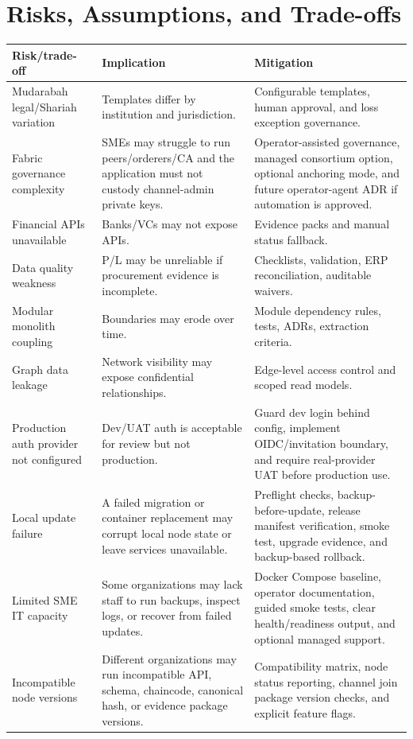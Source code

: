 \documentclass[11pt,a4paper]{article}
\begin{document}
\section{Risks, Assumptions, and Trade-offs}
\begin{longtable}{L{36mm}L{70mm}L{36mm}}
\toprule
\textbf{Risk/trade-off} & \textbf{Implication} & \textbf{Mitigation} \\
\midrule
Mudarabah legal/Shariah variation & Templates differ by institution and jurisdiction. & Configurable templates, human approval, and loss exception governance. \\
Fabric governance complexity & SMEs may struggle to run peers/orderers/CA and the application must not custody channel-admin private keys. & Operator-assisted governance, managed consortium option, optional anchoring mode, and future operator-agent ADR if automation is approved. \\
Financial APIs unavailable & Banks/VCs may not expose APIs. & Evidence packs and manual status fallback. \\
Data quality weakness & P/L may be unreliable if procurement evidence is incomplete. & Checklists, validation, ERP reconciliation, auditable waivers. \\
Modular monolith coupling & Boundaries may erode over time. & Module dependency rules, tests, ADRs, extraction criteria. \\
Graph data leakage & Network visibility may expose confidential relationships. & Edge-level access control and scoped read models. \\
Production auth provider not configured & Dev/UAT auth is acceptable for review but not production. & Guard dev login behind config, implement OIDC/invitation boundary, and require real-provider UAT before production use. \\
Local update failure & A failed migration or container replacement may corrupt local node state or leave services unavailable. & Preflight checks, backup-before-update, release manifest verification, smoke test, upgrade evidence, and backup-based rollback. \\
Limited SME IT capacity & Some organizations may lack staff to run backups, inspect logs, or recover from failed updates. & Docker Compose baseline, operator documentation, guided smoke tests, clear health/readiness output, and optional managed support. \\
Incompatible node versions & Different organizations may run incompatible API, schema, chaincode, canonical hash, or evidence package versions. & Compatibility matrix, node status reporting, channel join package version checks, and explicit feature flags. \\

\end{longtable}
\end{document}
